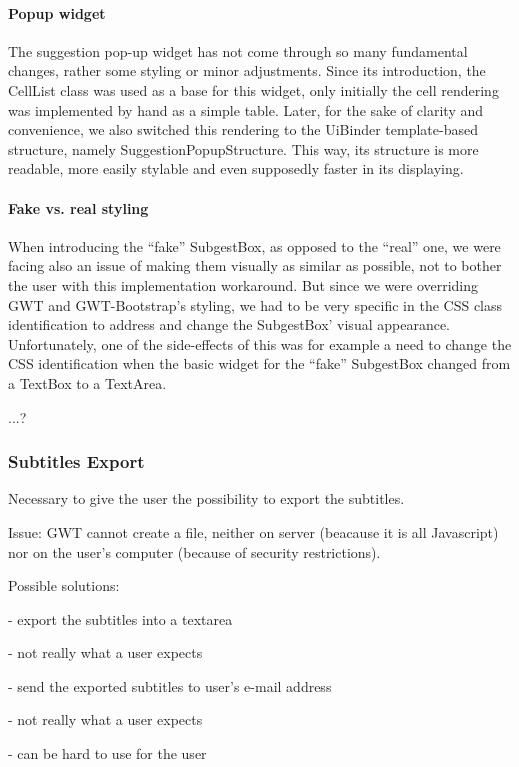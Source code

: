 \paragraph{Popup widget}
The suggestion pop-up widget has not come through so many fundamental changes, rather some styling or minor adjustments. Since its introduction, the CellList class was used as a base for this widget, only initially the cell rendering was implemented by hand as a simple table. Later, for the sake of clarity and convenience, we also switched this rendering to the UiBinder template-based structure, namely SuggestionPopupStructure. This way, its structure is more readable, more easily stylable and even supposedly faster in its displaying.

\paragraph{Fake vs. real styling}
When introducing the ``fake'' SubgestBox, as opposed to the ``real'' one, we were facing also an issue of making them visually as similar as possible, not to bother the user with this implementation workaround. But since we were overriding GWT and GWT-Bootstrap's styling, we had to be very specific in the CSS class identification to address and change the SubgestBox' visual appearance. Unfortunately, one of the side-effects of this was for example a need to change the CSS identification when the basic widget for the ``fake'' SubgestBox changed from a TextBox to a TextArea.

...?

\subsubsection{Subtitles Export}

Necessary to give the user the possibility to export the subtitles.

Issue: GWT cannot create a file, neither on server (beacause it is all Javascript) nor on the user's computer (because of security restrictions).

Possible solutions:

- export the subtitles into a textarea

  - not really what a user expects

- send the exported subtitles to user's e-mail address

  - not really what a user expects
  
  - can be hard to use for the user
  
